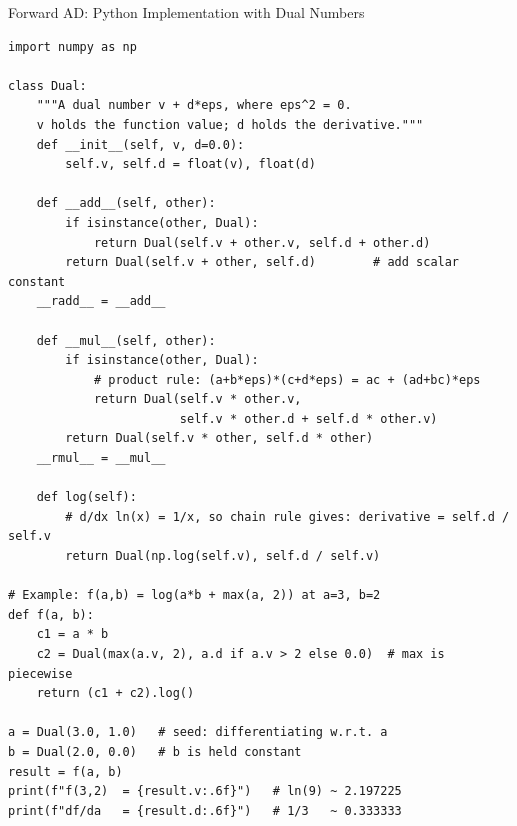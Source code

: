 \documentclass[aspectratio=169,10pt]{beamer}
\begin{document}
\begin{frame}[fragile]{Forward AD: Python Implementation with Dual Numbers}
\begin{lstlisting}[caption={Dual number class implementing forward-mode automatic differentiation}]
import numpy as np

class Dual:
    """A dual number v + d*eps, where eps^2 = 0.
    v holds the function value; d holds the derivative."""
    def __init__(self, v, d=0.0):
        self.v, self.d = float(v), float(d)

    def __add__(self, other):
        if isinstance(other, Dual):
            return Dual(self.v + other.v, self.d + other.d)
        return Dual(self.v + other, self.d)        # add scalar constant
    __radd__ = __add__

    def __mul__(self, other):
        if isinstance(other, Dual):
            # product rule: (a+b*eps)*(c+d*eps) = ac + (ad+bc)*eps
            return Dual(self.v * other.v,
                        self.v * other.d + self.d * other.v)
        return Dual(self.v * other, self.d * other)
    __rmul__ = __mul__

    def log(self):
        # d/dx ln(x) = 1/x, so chain rule gives: derivative = self.d / self.v
        return Dual(np.log(self.v), self.d / self.v)

# Example: f(a,b) = log(a*b + max(a, 2)) at a=3, b=2
def f(a, b):
    c1 = a * b
    c2 = Dual(max(a.v, 2), a.d if a.v > 2 else 0.0)  # max is piecewise
    return (c1 + c2).log()

a = Dual(3.0, 1.0)   # seed: differentiating w.r.t. a
b = Dual(2.0, 0.0)   # b is held constant
result = f(a, b)
print(f"f(3,2)  = {result.v:.6f}")   # ln(9) ~ 2.197225
print(f"df/da   = {result.d:.6f}")   # 1/3   ~ 0.333333
\end{lstlisting}
\end{frame}
\end{document}
